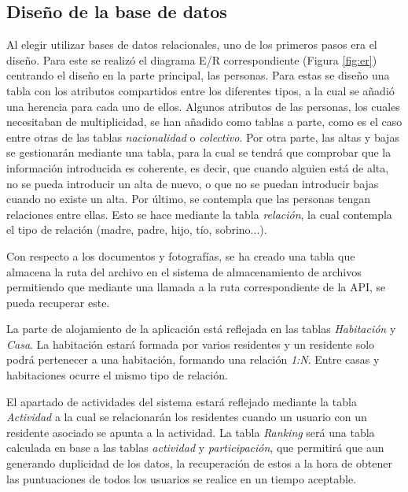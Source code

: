 \subsection{Diseño de la base de datos}

Al elegir utilizar bases de datos relacionales, uno de los primeros pasos era el diseño. Para este se realizó el diagrama E/R correspondiente (Figura \ref{fig:er}) centrando el diseño en la parte principal, las personas. Para estas se diseño una tabla con los atributos compartidos entre los diferentes tipos, a la cual se añadió una herencia para cada uno de ellos. Algunos atributos de las personas, los cuales necesitaban de multiplicidad, se han añadido como tablas a parte, como es el caso entre otras de las tablas \textit{nacionalidad} o \textit{colectivo}. Por otra parte, las altas y bajas se gestionarán mediante una tabla, para la cual se tendrá que comprobar que la información introducida es coherente, es decir, que cuando alguien está de alta, no se pueda introducir un alta de nuevo, o que no se puedan introducir bajas cuando no existe un alta. Por último, se contempla que las personas tengan relaciones entre ellas. Esto se hace mediante la tabla \textit{relación}, la cual contempla el tipo de relación (madre, padre, hijo, tío, sobrino...).

Con respecto a los documentos y fotografías, se ha creado una tabla que almacena la ruta del archivo en el sistema de almacenamiento de archivos permitiendo que mediante una llamada a la ruta correspondiente de la API, se pueda recuperar este.

La parte de alojamiento de la aplicación está reflejada en las tablas \textit{Habitación} y \textit{Casa}. La habitación estará formada por varios residentes y un residente solo podrá pertenecer a una habitación, formando una relación \textit{1:N}. Entre casas y habitaciones ocurre el mismo tipo de relación. 

El apartado de actividades del sistema estará reflejado mediante la tabla \textit{Actividad} a la cual se relacionarán los residentes cuando un usuario con un residente asociado se apunta a la actividad. La tabla \textit{Ranking} será una tabla calculada en base a las tablas \textit{actividad} y \textit{participación}, que permitirá que aun generando duplicidad de los datos, la recuperación de estos a la hora de obtener las puntuaciones de todos los usuarios se realice en un tiempo aceptable. 

